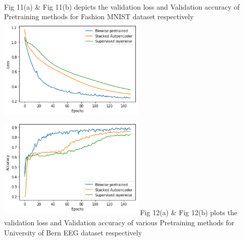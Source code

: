 \documentclass{article}
\begin{document}
\\
Fig 11(a) \& Fig 11(b) depicts the validation loss and Validation accuracy of Pretraining methods for Fashion MNIST dataset respectively
\\
\includegraphics[width= 7cm, height=5cm]{fig11.png}
\includegraphics[width= 7cm, height=5cm]{fig12.png}
Fig 12(a) \& Fig 12(b) plots the validation loss and Validation accuracy of various Pretraining methods for University of Bern EEG dataset respectively
\end{document}
